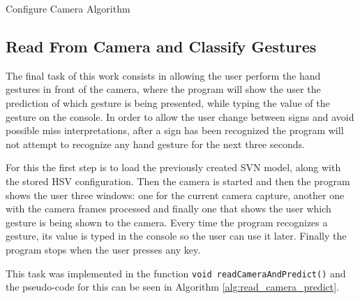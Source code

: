 \documentclass[a4paper,10pt,english]{article}
\begin{document}
        \begin{algorithm}[H]
            \BlankLine
            \caption{Configure Camera Algorithm} \label{alg:configure_camera}
        \end{algorithm}
        
        \subsection{Read From Camera and Classify Gestures}
         
         The final task of this work consists in allowing the user perform the hand gestures in front of the camera, where the program will show the user the prediction of which gesture is being presented, while typing the value of the gesture on the console. In order to allow the user change between signs and avoid possible miss interpretations, after a sign has been recognized the program will not attempt to recognize any hand gesture for the next three seconds.
         
         For this the first step is to load the previously created SVN model, along with the stored HSV configuration. Then the camera is started and then the program shows the user three windows: one for the current camera capture, another one with the camera frames processed and finally one that shows the user which gesture is being shown to the camera. Every time the program recognizes a gesture, its value is typed in the console so the user can use it later. Finally the program stops when the user presses any key.
         
         This task was implemented in the function \texttt{void readCameraAndPredict()} and the pseudo-code for this can be seen in Algorithm \ref{alg:read_camera_predict}.
         
\end{document}
